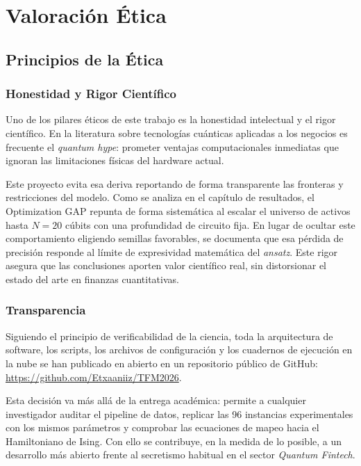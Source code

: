 \chapter{Valoración Ética}
\label{ch:valoracion_etica}

\section{Principios de la Ética}
\label{sec:cumplimiento_etica_profesional}

\subsection{Honestidad y Rigor Científico}
Uno de los pilares éticos de este trabajo es la honestidad intelectual y el rigor científico. En la literatura sobre tecnologías cuánticas aplicadas a los negocios es frecuente el \textit{quantum hype}: prometer ventajas computacionales inmediatas que ignoran las limitaciones físicas del hardware actual.

Este proyecto evita esa deriva reportando de forma transparente las fronteras y restricciones del modelo. Como se analiza en el capítulo de resultados, el Optimization GAP repunta de forma sistemática al escalar el universo de activos hasta $N=20$ cúbits con una profundidad de circuito fija. En lugar de ocultar este comportamiento eligiendo semillas favorables, se documenta que esa pérdida de precisión responde al límite de expresividad matemática del \textit{ansatz}. Este rigor asegura que las conclusiones aporten valor científico real, sin distorsionar el estado del arte en finanzas cuantitativas.

\subsection{Transparencia}
Siguiendo el principio de verificabilidad de la ciencia, toda la arquitectura de software, los scripts, los archivos de configuración y los cuadernos de ejecución en la nube se han publicado en abierto en un repositorio público de GitHub: {\url{https://github.com/Etxaaniiz/TFM2026}}.

Esta decisión va más allá de la entrega académica: permite a cualquier investigador auditar el pipeline de datos, replicar las 96 instancias experimentales con los mismos parámetros y comprobar las ecuaciones de mapeo hacia el Hamiltoniano de Ising. Con ello se contribuye, en la medida de lo posible, a un desarrollo más abierto frente al secretismo habitual en el sector \textit{Quantum Fintech}.

